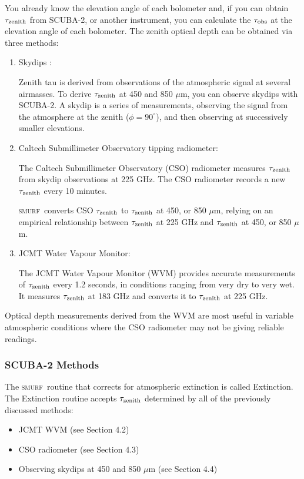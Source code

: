 \documentclass[twoside,11pt]{article}
\renewcommand{\_}{\texttt{\symbol{95}}}
\newcommand{\SMURF}{\textsc{smurf}}
\begin{document}
You already know the elevation angle of each bolometer and, if you can
obtain $\tau_{\rm zenith}$ from SCUBA-2, or another instrument, you
can calculate the $\tau_{\rm obs}$ at the elevation angle of each
bolometer. The zenith optical depth can be obtained via three methods:
\begin{enumerate}
\item Skydips :

Zenith tau is derived from observations of the atmospheric signal at
several airmasses. To derive $\tau_{\rm zenith}$ at 450 and 850
$\mu$m, you can observe skydips with SCUBA-2.  A skydip is a series of
measurements, observing the signal from the atmosphere at the zenith
($\phi = 90^\circ$), and then observing at successively smaller
elevations.

\item Caltech Submillimeter Observatory tipping radiometer:

The Caltech Submillimeter Observatory (CSO) radiometer measures
$\tau_{\rm zenith}$ from skydip observations at 225 GHz. The CSO
radiometer records a new $\tau_{\rm zenith}$ every 10 minutes.

\SMURF\ converts CSO $\tau_{\rm zenith}$ to $\tau_{\rm zenith}$ at 450,
or 850 $\mu$m, relying on an empirical relationship between $\tau_{\rm
  zenith}$ at 225 GHz and $\tau_{\rm zenith}$ at 450, or 850 $\mu$m.

\item JCMT Water Vapour Monitor:

The JCMT Water Vapour Monitor (WVM) provides accurate measurements of
$\tau_{\rm zenith}$ every 1.2 seconds, in conditions ranging from very
dry to very wet. It measures $\tau_{\rm zenith}$ at 183 GHz and
converts it to $\tau_{\rm zenith}$ at 225 GHz.

\end{enumerate}
Optical depth measurements derived from the WVM are most useful in
variable atmospheric conditions where the CSO radiometer may not be
giving reliable readings.

\subsubsection{SCUBA-2 Methods}

The \SMURF\ routine that corrects for atmospheric extinction is called
Extinction.  The Extinction routine accepts $\tau_{\rm zenith}$
determined by all of the previously discussed methods:
\begin{itemize}
\item JCMT WVM (see Section 4.2)
\item CSO radiometer (see Section 4.3)
\item Observing skydips at 450 and 850 $\mu$m (see Section 4.4)
\end{itemize}
\end{document}
